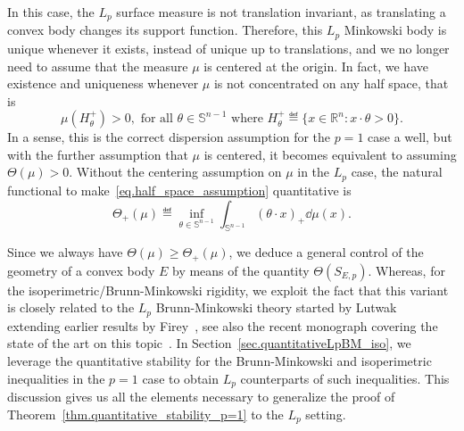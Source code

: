 \documentclass[a4paper, 10pt, twoside]{amsart}
\numberwithin{equation}{section}
\theoremstyle{plain}
\theoremstyle{definition}
\begin{document}
In this case, the $L_p$ surface measure is not translation invariant, as translating a convex body changes its support function. Therefore, this $L_p$ Minkowski body is unique whenever it exists, instead of unique up to translations, and we no longer need to assume that the measure $\mu$ is centered at the origin. In fact, we have existence and uniqueness whenever $\mu$ is not concentrated on any half space, that is 
\begin{equation}\label{eq.half_space_assumption}
    \mu(H_\theta^+) > 0, \text{ for all $\theta \in \mathbb{S}^{n-1}$ where }
    H_\theta^+ \eqdef \{
        x \in \mathbb{R}^n : x\cdot \theta > 0
    \}.
\end{equation}
In a sense, this is the correct dispersion assumption for the $p = 1$ case a well, but with the further assumption that $\mu$ is centered, it becomes equivalent to assuming $\Theta(\mu) > 0$. Without the centering assumption on $\mu$ in the $L_p$ case, the natural functional to make~\eqref{eq.half_space_assumption} quantitative is 
\begin{equation}
    \Theta_+(\mu) 
    \eqdef 
    \inf_{\theta \in \mathbb{S}^{n-1}} 
    \int_{\mathbb{S}^{n-1}} 
    (\theta\cdot x)_+ \dd \mu(x). 
\end{equation}

Since we always have $\Theta(\mu) \ge \Theta_+(\mu)$, we deduce a general control of the geometry of a convex body $E$ by means of the quantity $\Theta(S_{E,p})$. Whereas, for the isoperimetric/Brunn-Minkowski rigidity, we exploit the fact that this variant is closely related to the $L_p$ Brunn-Minkowski theory started by 
Lutwak~\cite{lutwak1992brunn-minkowki-firey,lutwak1996brunn} extending earlier results by Firey~\cite{firey1962p,firey1974shapes}, see also the recent monograph covering the state of the art on this topic~\cite{boroczky2025isoperimetric}. In Section~\ref{sec.quantitativeLpBM_iso}, we leverage the quantitative stability for the Brunn-Minkowski and isoperimetric inequalities in the $p = 1$ case to obtain $L_p$ counterparts of such inequalities. This discussion gives us all the elements necessary to generalize the proof of Theorem~\ref{thm.quantitative_stability_p=1} to the $L_p$ setting.
\end{document}
